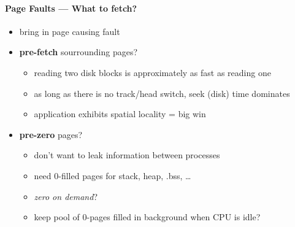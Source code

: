 \paragraph{Page Faults --- What to fetch?}
\begin{itemize}
  \item bring in page causing fault
  \item \textbf{pre-fetch} sourrounding pages?
  \begin{itemize}
    \item reading two disk blocks is approximately as fast as reading one
    \item as long as there is no track/head switch, seek (disk) time dominates
    \item application exhibits spatial locality = big win
  \end{itemize}
  \item \textbf{pre-zero} pages?
  \begin{itemize}
    \item don't want to leak information between processes
    \item need 0-filled pages for stack, heap, .bss, \dots
    \item \emph{zero on demand}?
    \item keep pool of 0-pages filled in background when CPU is idle?
  \end{itemize}
\end{itemize}

